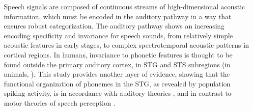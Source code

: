 Speech signals are composed of continuous streams of high-dimensional acoustic information, which must be encoded in the auditory pathway in a way that ensures robust categorization. The auditory pathway shows an increasing encoding specificity and invariance for speech sounds, from relatively simple acoustic features in early stages, to complex spectrotemporal acoustic patterns in cortical regions. In humans, invariance to phonetic features is thought to be found outside the primary auditory cortex, in STG and STS subregions \citep{Dewitt2012} (in animals, \citealp[see]{mesgarani2008phoneme}). This study provides another layer of evidence, showing that the functional organization of phonemes in the STG, as revealed by population spiking activity, is in accordance with auditory theories \citep{stevens1989quantal, stevens2002toward}, and in contrast to motor theories of speech perception \citep{liberman1985motor, browman1992articulatory}.